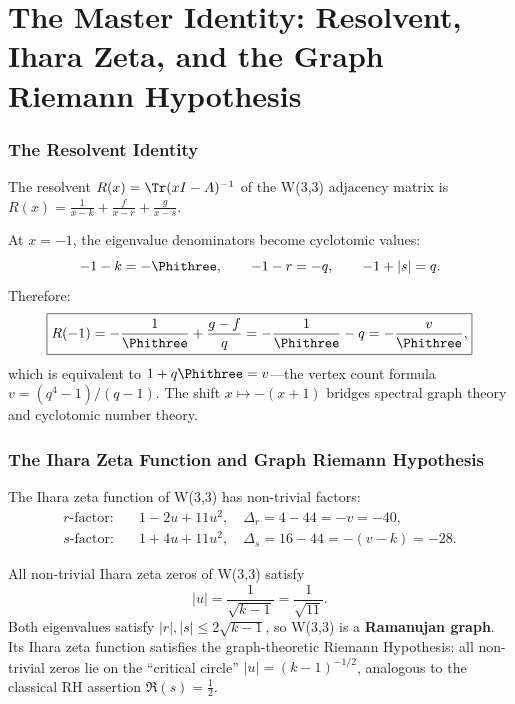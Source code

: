 \clearpage
\part{The Master Identity: Resolvent, Ihara Zeta, and the Graph Riemann Hypothesis}

\section{The Resolvent Identity}

The resolvent $R(x) = \Tr(xI-A)^{-1}$ of the W(3,3) adjacency
matrix is $R(x) = \frac{1}{x-k} + \frac{f}{x-r} + \frac{g}{x-s}$.

\begin{theorem}
\label{thm:resolvent}
At $x=-1$, the eigenvalue denominators become cyclotomic values:
\begin{equation}
-1-k = -\Phithree, \qquad -1-r = -q, \qquad -1+|s| = q.
\end{equation}
Therefore:
\begin{equation}
\boxed{R(-1) = -\frac{1}{\Phithree} + \frac{g-f}{q} = -\frac{1}{\Phithree} - q = -\frac{v}{\Phithree},}
\end{equation}
which is equivalent to $1 + q\Phithree = v$---the vertex count formula
$v = (q^4{-}1)/(q{-}1)$. The shift $x\mapsto -(x{+}1)$ bridges
spectral graph theory and cyclotomic number theory.
\end{theorem}


\section{The Ihara Zeta Function and Graph Riemann Hypothesis}

The Ihara zeta function of W(3,3) has non-trivial factors:
\begin{align}
\text{$r$-factor:}& \quad 1-2u+11u^2, \quad \Delta_r = 4-44 = -v = -40,\\
\text{$s$-factor:}& \quad 1+4u+11u^2, \quad \Delta_s = 16-44 = -(v{-}k) = -28.
\end{align}

\begin{theorem}
\label{thm:graph-rh}
All non-trivial Ihara zeta zeros of W(3,3) satisfy
\begin{equation}
\boxed{|u| = \frac{1}{\sqrt{k-1}} = \frac{1}{\sqrt{11}}.}
\end{equation}
Both eigenvalues satisfy $|r|, |s| \leq 2\sqrt{k-1}$,
so W(3,3) is a \textbf{Ramanujan graph}.
Its Ihara zeta function satisfies the graph-theoretic Riemann Hypothesis:
all non-trivial zeros lie on the ``critical circle'' $|u|=(k{-}1)^{-1/2}$,
analogous to the classical RH assertion $\Re(s)=\tfrac{1}{2}$.
\end{theorem}

